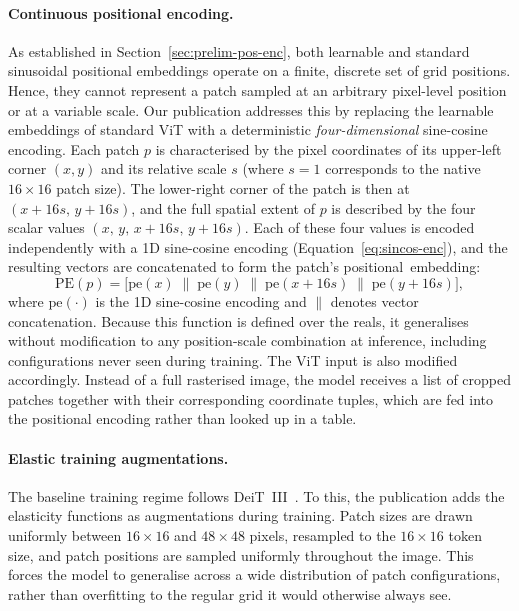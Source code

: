\paragraph{Continuous positional encoding.} As established in Section~\ref{sec:prelim-pos-enc}, both learnable and standard sinusoidal positional embeddings operate on a finite, discrete set of grid positions. Hence, they cannot represent a patch sampled at an arbitrary pixel-level position or at a variable scale. Our publication addresses this by replacing the learnable embeddings of standard ViT with a deterministic \emph{four-dimensional} sine-cosine encoding. Each patch $p$ is characterised by the pixel coordinates of its upper-left corner $(x, y)$ and its relative scale $s$ (where $s = 1$ corresponds to the native $16\times16$ patch size). The lower-right corner of the patch is then at $(x + 16s,\, y + 16s)$, and the full spatial extent of $p$ is described by the four scalar values $(x,\, y,\, x+16s,\, y+16s)$. Each of these four values is encoded independently with a 1D sine-cosine encoding (Equation~\ref{eq:sincos-enc}), and the resulting vectors are concatenated to form the patch's positional~embedding:
\begin{equation}
    \mathrm{PE}(p) = \bigl[\mathrm{pe}(x)\;\|\;\mathrm{pe}(y)\;\|\;\mathrm{pe}(x+16s)\;\|\;\mathrm{pe}(y+16s)\bigr],
    \label{eq:pos-enc}
\end{equation}
where $\mathrm{pe}(\cdot)$ is the 1D sine-cosine encoding and $\|$ denotes vector concatenation. Because this function is defined over the reals, it generalises without modification to any position-scale combination at inference, including configurations never seen during training. The ViT input is also modified accordingly. Instead of a full rasterised image, the model receives a list of cropped patches together with their corresponding coordinate tuples, which are fed into the positional encoding rather than looked up in a table.

\paragraph{Elastic training augmentations.} The baseline training regime follows DeiT~III~\cite{touvron2022deitiii}. To this, the publication adds the elasticity functions as augmentations during training. Patch sizes are drawn uniformly between $16\times16$ and $48\times48$ pixels, resampled to the $16\times16$ token size, and patch positions are sampled uniformly throughout the image. This forces the model to generalise across a wide distribution of patch configurations, rather than overfitting to the regular grid it would otherwise always see.

